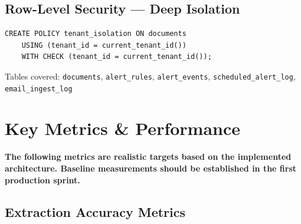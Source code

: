 \documentclass[12pt,a4paper]{article}
\newcommand{\keypoint}[1]{%
  \begin{tcolorbox}[colback=HighlightYellow, colframe=NordicGold,
    boxrule=1.2pt, arc=4pt, left=8pt, right=8pt, top=5pt, bottom=5pt]
    \faExclamationCircle\hspace{6pt}\textbf{#1}
  \end{tcolorbox}
}
\newcommand{\codeinline}[1]{\texttt{\small\color{NordicBlue}#1}}
\begin{document}
\subsection{Row-Level Security — Deep Isolation}

\begin{tcolorbox}[colback=LightBg, colframe=NordicRed!60, boxrule=1pt, arc=4pt,
  title={\small\textbf{Multi-tenant data isolation — even if application layer is bypassed}}]
\begin{verbatim}
CREATE POLICY tenant_isolation ON documents
    USING (tenant_id = current_tenant_id())
    WITH CHECK (tenant_id = current_tenant_id());
\end{verbatim}
Tables covered: \codeinline{documents}, \codeinline{alert\_rules}, \codeinline{alert\_events}, \codeinline{scheduled\_alert\_log}, \codeinline{email\_ingest\_log}
\end{tcolorbox}

\newpage

\section{Key Metrics \& Performance}

\keypoint{The following metrics are realistic targets based on the implemented architecture. Baseline measurements should be established in the first production sprint.}

\subsection{Extraction Accuracy Metrics}
\end{document}
